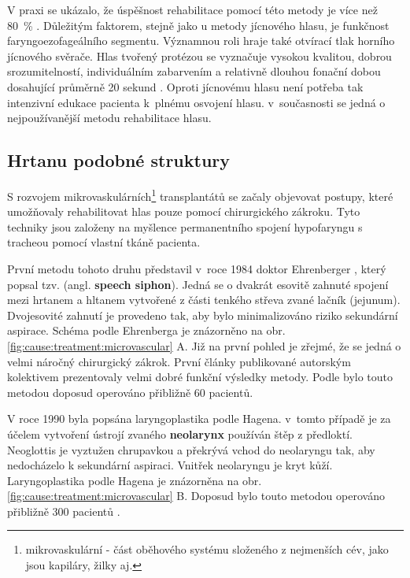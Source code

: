 V praxi se ukázalo, že úspěšnost rehabilitace pomocí této metody je více než 80~\%
\cite{Slavicek2002}. Důležitým faktorem, stejně jako u metody jícnového hlasu, je
funkčnost faryngoezofageálního segmentu. Významnou roli hraje také otvírací tlak horního
jícnového svěrače. Hlas tvořený protézou se vyznačuje vysokou kvalitou, dobrou
srozumitelností, individuálním zabarvením a relativně dlouhou fonační dobou
dosahující průměrně 20 sekund \cite{Saito2003}. Oproti jícnovému hlasu není potřeba
tak intenzivní edukace pacienta k~plnému osvojení hlasu. v~současnosti se
jedná o nejpoužívanější metodu rehabilitace hlasu.


\subsection{Hrtanu podobné struktury} %
\label{chap:cause:tratment:structure}

S rozvojem mikrovaskulárních\footnote{mikrovaskulární - část oběhového systému
složeného z nejmenších cév, jako jsou kapiláry, žilky aj.} transplantátů se
začaly objevovat postupy, které umožňovaly rehabilitovat hlas pouze pomocí
chirurgického zákroku. Tyto techniky jsou založeny na myšlence permanentního spojení hypofaryngu
s tracheou pomocí vlastní tkáně pacienta.

První metodu tohoto druhu představil v~roce 1984 doktor Ehrenberger
\cite{Kramp2009}, který popsal tzv. 
(angl. \textbf{speech siphon}). Jedná se o dvakrát esovitě zahnuté spojení mezi hrtanem a hltanem
vytvořené z části tenkého střeva zvané lačník (jejunum). Dvojesovité zahnutí je provedeno tak, aby
bylo minimalizováno riziko sekundární aspirace. Schéma 
podle Ehrenberga je znázorněno na obr. \ref{fig:cause:treatment:microvascular}
A. Již na první pohled je zřejmé, že se jedná o velmi náročný chirurgický
zákrok. První články publikované autorským kolektivem prezentovaly velmi dobré
funkční výsledky metody. Podle \cite {Sebova-Sedenkova2006} bylo touto metodou doposud
operováno přibližně 60 pacientů.

V roce 1990 byla popsána laryngoplastika podle Hagena. v~tomto případě je za účelem vytvoření ústrojí zvaného \textbf{neolarynx} používán štěp z předloktí. Neoglottis je vyztužen chrupavkou
a překrývá vchod do neolaryngu tak, aby nedocházelo k sekundární aspiraci. Vnitřek neolaryngu je kryt kůží.
Laryngoplastika podle Hagena je znázorněna na obr.
\ref{fig:cause:treatment:microvascular} B. Doposud bylo touto metodou operováno přibližně 300
pacientů \cite{Sebova-Sedenkova2006}.

